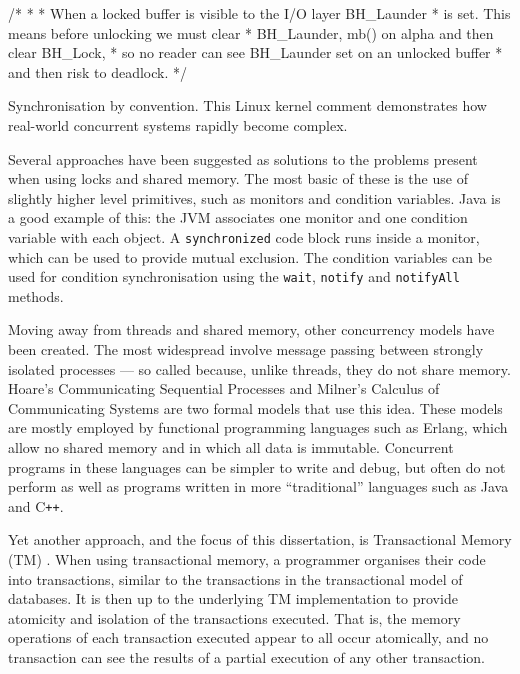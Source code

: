 \documentclass[12pt,a4paper,twoside,openright]{report}
\newcommand{\mycaption}[2]{\caption[#1]{#1 #2}}
\newcommand{\javaKeyword}[1]{\texttt{#1}}
\newcommand{\javaMethod}[1]{\texttt{#1}}
\begin{document}
\begin{Listing}[hbtp]
  \begin{JavaCode}
    /* * * When a locked buffer is visible to the I/O layer BH_Launder
    * is set. This means before unlocking we must clear * BH_Launder,
    mb() on alpha and then clear BH_Lock, * so no reader can see
    BH_Launder set on an unlocked buffer * and then risk to deadlock.
    */
  \end{JavaCode}
  \mycaption{Synchronisation by convention.}{This Linux kernel comment
    demonstrates how real-world concurrent systems rapidly become
    complex.}
  \label{lst:syncConv}
\end{Listing}

Several approaches have been suggested as solutions to the problems
present when using locks and shared memory. The most basic of these is
the use of slightly higher level primitives, such as monitors and
condition variables. Java is a good example of this: the JVM
associates one monitor and one condition variable with each object. A
\javaKeyword{synchronized} code block runs inside a monitor, which can
be used to provide mutual exclusion. The condition variables can be
used for condition synchronisation using the \javaMethod{wait},
\javaMethod{notify} and \javaMethod{notifyAll} methods.

Moving away from threads and shared memory, other concurrency models
have been created. The most widespread involve message passing between
strongly isolated processes --- so called because, unlike threads,
they do not share memory. Hoare's Communicating Sequential Processes
\cite{CSP} and Milner's Calculus of Communicating Systems \cite{CCS}
are two formal models that use this idea. These models are mostly
employed by functional programming languages such as Erlang, which
allow no shared memory and in which all data is immutable. Concurrent
programs in these languages can be simpler to write and debug, but
often do not perform as well as programs written in more
``traditional'' languages such as Java and C\texttt{++}.

Yet another approach, and the focus of this dissertation, is
Transactional Memory (TM) \cite{TMBook}. When using transactional
memory, a programmer organises their code into transactions, similar
to the transactions in the transactional model of databases. It is
then up to the underlying TM implementation to provide atomicity and
isolation of the transactions executed. That is, the memory operations
of each transaction executed appear to all occur atomically, and no
transaction can see the results of a partial execution of any other
transaction.
\end{document}
